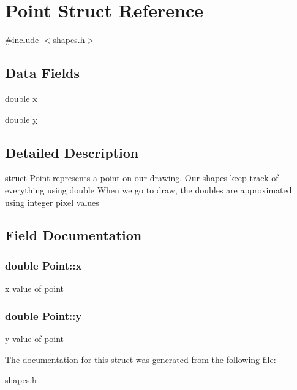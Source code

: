 \hypertarget{structPoint}{
\section{Point Struct Reference}
\label{structPoint}
}


{\ttfamily \#include $<$shapes.h$>$}\subsection*{Data Fields}
\begin{DoxyCompactItemize}
\item 
double \hyperlink{structPoint_ab99c56589bc8ad5fa5071387110a5bc7}{x}
\item 
double \hyperlink{structPoint_afa38be143ae800e6ad69ce8ed4df62d8}{y}
\end{DoxyCompactItemize}


\subsection{Detailed Description}
struct \hyperlink{structPoint}{Point} represents a point on our drawing. Our shapes keep track of everything using double When we go to draw, the doubles are approximated using integer pixel values 

\subsection{Field Documentation}
\hypertarget{structPoint_ab99c56589bc8ad5fa5071387110a5bc7}{
\subsubsection[{x}]{\setlength{\rightskip}{0pt plus 5cm}double {\bf Point::x}}}
\label{structPoint_ab99c56589bc8ad5fa5071387110a5bc7}
x value of point \hypertarget{structPoint_afa38be143ae800e6ad69ce8ed4df62d8}{
\subsubsection[{y}]{\setlength{\rightskip}{0pt plus 5cm}double {\bf Point::y}}}
\label{structPoint_afa38be143ae800e6ad69ce8ed4df62d8}
y value of point 

The documentation for this struct was generated from the following file:\begin{DoxyCompactItemize}
\item 
shapes.h\end{DoxyCompactItemize}
